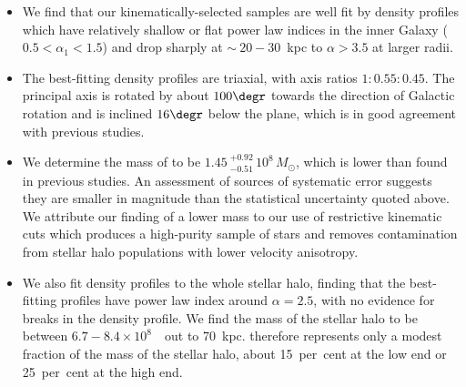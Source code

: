 \begin{itemize}
    \item We find that our kinematically-selected \gse samples are well fit by density profiles which have relatively shallow or flat power law indices in the inner Galaxy ($0.5 < \alpha_{1} < 1.5$) and drop sharply at $\sim~20-30$~kpc to $\alpha>3.5$ at larger radii.
    
    \item The best-fitting \gse density profiles are triaxial, with axis ratios $1:0.55:0.45$. The principal axis is rotated by about $100\degr$ towards the direction of Galactic rotation and is inclined $16\degr$ below the plane, which is in good agreement with previous studies.

    \item We determine the mass of \gse to be $1.45\ ^{+0.92}_{-0.51}\,10^8\,M_\odot$, which is lower than found in previous studies. An assessment of sources of systematic error suggests they are smaller in magnitude than the statistical uncertainty quoted above. We attribute our finding of a lower mass to our use of restrictive kinematic cuts which produces a high-purity sample of \gse stars and removes contamination from stellar halo populations with lower velocity anisotropy.


    \item We also fit density profiles to the whole stellar halo, finding that the best-fitting profiles have power law index around $\alpha=2.5$, with no evidence for breaks in the density profile. We find the mass of the stellar halo to be between $6.7-8.4\times10^{8}$~\Msun\ out to 70~kpc. \gse therefore represents only a modest fraction of the mass of the stellar halo, about 15~per~cent at the low end or 25~per~cent at the high end.
\end{itemize}

